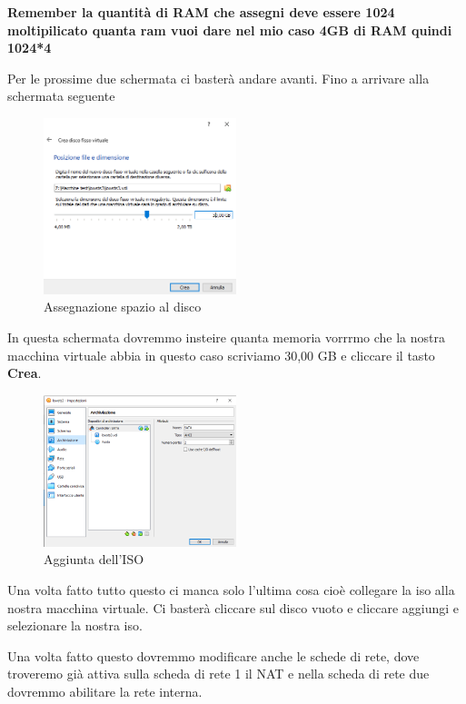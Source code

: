 \documentclass[../main.tex]{subfiles}
\begin{document}
\textbf{Remember la quantità di RAM che assegni deve essere 1024 moltipilicato quanta ram vuoi dare nel mio caso 4GB di RAM quindi 1024*4}

Per le prossime due schermata ci basterà andare avanti. Fino a arrivare alla schermata seguente

\begin{figure}[h]
    \centering
    \includegraphics[width=0.5\textwidth]{Images/set-up5.PNG}
    \caption{Assegnazione spazio al disco}
\end{figure}

In questa schermata dovremmo insteire quanta memoria vorrrmo che la nostra macchina virtuale abbia in questo caso scriviamo 30,00 GB e cliccare il tasto \textbf{Crea}.


\begin{figure}[h]
    \centering
    \includegraphics[width=0.5\textwidth]{Images/set-up6.PNG}
    \caption{Aggiunta dell'ISO}
\end{figure}
\pagebreak{}
\thispagestyle{header-pages}


Una volta fatto tutto questo ci manca solo l'ultima cosa cioè collegare la iso alla nostra macchina virtuale. Ci basterà cliccare sul disco vuoto e cliccare aggiungi e selezionare la nostra iso.


Una volta fatto questo dovremmo modificare anche le schede di rete, dove troveremo già attiva sulla scheda di rete 1 il NAT e nella scheda di rete due dovremmo abilitare la rete interna. 
\end{document}
